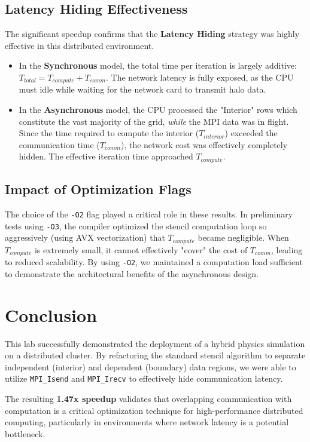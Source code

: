 \documentclass[12pt]{article}
\begin{document}
\subsection{Latency Hiding Effectiveness}
The significant speedup confirms that the \textbf{Latency Hiding} strategy was highly effective in this distributed environment.
\begin{itemize}
    \item In the \textbf{Synchronous} model, the total time per iteration is largely additive: $T_{total} = T_{compute} + T_{comm}$. The network latency is fully exposed, as the CPU must idle while waiting for the network card to transmit halo data.
    \item In the \textbf{Asynchronous} model, the CPU processed the "Interior" rows which constitute the vast majority of the grid, \textit{while} the MPI data was in flight. Since the time required to compute the interior ($T_{interior}$) exceeded the communication time ($T_{comm}$), the network cost was effectively completely hidden. The effective iteration time approached $T_{compute}$.
\end{itemize}

\subsection{Impact of Optimization Flags}
The choice of the \texttt{-O2} flag played a critical role in these results. In preliminary tests using \texttt{-O3}, the compiler optimized the stencil computation loop so aggressively (using AVX vectorization) that $T_{compute}$ became negligible. When $T_{compute}$ is extremely small, it cannot effectively "cover" the cost of $T_{comm}$, leading to reduced scalability. By using \texttt{-O2}, we maintained a computation load sufficient to demonstrate the architectural benefits of the asynchronous design.

\section{Conclusion}

This lab successfully demonstrated the deployment of a hybrid physics simulation on a distributed cluster. By refactoring the standard stencil algorithm to separate independent (interior) and dependent (boundary) data regions, we were able to utilize \texttt{MPI\_Isend} and \texttt{MPI\_Irecv} to effectively hide communication latency.

The resulting \textbf{1.47x speedup} validates that overlapping communication with computation is a critical optimization technique for high-performance distributed computing, particularly in environments where network latency is a potential bottleneck.
\end{document}
